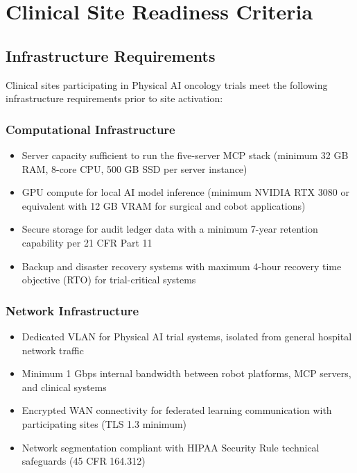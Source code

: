 \documentclass[11pt,letterpaper]{article}
\begin{document}
\section{Clinical Site Readiness Criteria}
\label{sec:part7}

\subsection{Infrastructure Requirements}

Clinical sites participating in Physical AI oncology trials \SHALL{} meet the following infrastructure requirements prior to site activation:

\subsubsection{Computational Infrastructure}

\begin{itemize}
  \item Server capacity sufficient to run the five-server MCP stack (minimum 32 GB RAM, 8-core CPU, 500 GB SSD per server instance)
  \item GPU compute for local AI model inference (minimum NVIDIA RTX 3080 or equivalent with 12 GB VRAM for surgical and cobot applications)
  \item Secure storage for audit ledger data with a minimum 7-year retention capability per 21 CFR Part 11
  \item Backup and disaster recovery systems with maximum 4-hour recovery time objective (RTO) for trial-critical systems
\end{itemize}

\subsubsection{Network Infrastructure}

\begin{itemize}
  \item Dedicated VLAN for Physical AI trial systems, isolated from general hospital network traffic
  \item Minimum 1 Gbps internal bandwidth between robot platforms, MCP servers, and clinical systems
  \item Encrypted WAN connectivity for federated learning communication with participating sites (TLS 1.3 minimum)
  \item Network segmentation compliant with HIPAA Security Rule technical safeguards (45 CFR 164.312)
\end{itemize}
\end{document}
